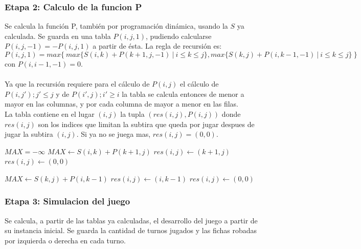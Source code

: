 \subsubsection{Etapa 2: Calculo de la funcion P}
Se calcula la funci\'on P, tambi\'en por programaci\'on din\'amica, usando la $S$ ya calculada. Se guarda en una tabla $P(i,j,1)$, pudiendo calcularse $P(i,j,-1) = -P(i,j,1)$ a partir de \'esta. La regla de recursi\'on es:
$$P(i,j,1) = max \{ \ max\{ S(i,k) + P(k+1,j,-1) \ | \  i \le k \le j \} , max\{ S(k,j) + P(i,k-1,-1) \ | \ i \le k\le j \} \ \}$$ con $P(i,i-1,-1) = 0$.\\
\\
Ya que la recursi\'on requiere para el c\'alculo de $P(i,j)$ el c\'alculo de $P(i,j') ; j' \le j$ y de $P(i',j) ; i' \ge i$ la tabla se calcula entonces de menor a mayor en las columnas, y por cada columna de mayor a menor en las filas.\\
La tabla contiene en el lugar $(i,j)$ la tupla $(res(i,j),P(i,j))$ donde $res(i,j)$ son los indices que limitan la subtira que queda por jugar despues de jugar la subtira $(i,j)$. Si ya no se juega mas, $res(i,j)=(0,0) $.\\

\begin{algorithmic}[1]
		\State $MAX = -\infty$
				\State $MAX \leftarrow S(i,k) + P(k+1,j)$
					\State $res(i,j) \leftarrow (k+1,j)$
				\Else
					\State $res(i,j) \leftarrow (0,0)$
				\EndIf
			\EndIf
		\EndFor


				\State $MAX \leftarrow S(k,j) + P(i,k-1)$
					\State $res(i,j) \leftarrow (i,k-1)$
				\Else
					\State $res(i,j) \leftarrow (0,0)$
				\EndIf
			\EndIf
		\EndFor
	\EndFor
\EndFor
\end{algorithmic}

\subsubsection{Etapa 3: Simulacion del juego} Se calcula, a partir de las tablas ya calculadas, el desarrollo del juego a partir de su instancia inicial. Se guarda la cantidad de turnos jugados y las fichas robadas por izquierda o derecha en cada turno.

